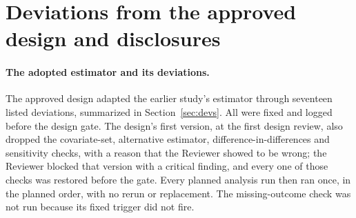 \documentclass[11pt]{article}
\begin{document}
\section{Deviations from the approved design and disclosures}
\label{sec:deviations}

\paragraph{The adopted estimator and its deviations.} The approved design adapted the
earlier study's estimator through seventeen listed deviations, summarized in
Section~\ref{sec:devs}. All were fixed and logged before the design gate. The design's
first version, at the first design review, also dropped the covariate-set, alternative
estimator, difference-in-differences and sensitivity checks, with a reason that the
Reviewer showed to be wrong; the Reviewer blocked that version with a critical finding, and
every one of those checks was restored before the gate. Every planned analysis run then
ran once, in the planned order, with no rerun or replacement. The missing-outcome check was
not run because its fixed trigger did not fire.
\end{document}

